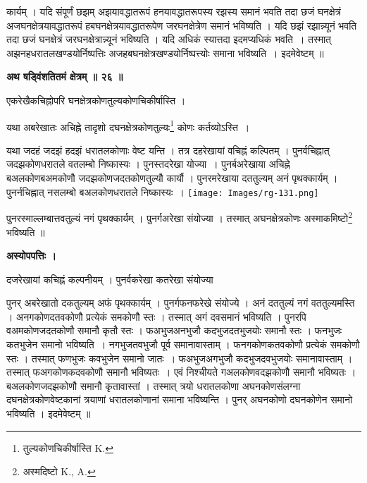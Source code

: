 \documentclass[11pt, openany]{book}
\begin{document}
\newpage
\noindent कार्यम् । यदि संपूर्णं छझम् अझयावद्धातरूपं हनयावद्धातरूपस्य रझस्य समानं भवति तदा छजं घनक्षेत्रं अजघनक्षेत्रयावद्धातरूपं हबघनक्षेत्रयावद्धातरूपेण जरघनक्षेत्रेण समानं भविष्यति । यदि छझं रझान्न्यूनं भवति तदा छजं घनक्षेत्रं जरघनक्षेत्रान्न्यूनं भविष्यति । यदि अधिकं स्यात्तदा इदमप्यधिकं भवति~। तस्मात् अझनहधरातलखण्डयोर्निष्पत्तिः अजहबघनक्षेत्रखण्डयोर्निष्पत्त्योः समाना भविष्यति~। इदमेवेष्टम् ॥\\
\vspace{3mm}

\begin{center}
\textbf{\large अथ षड्विंशतितमं क्षेत्रम् ॥ २६ ॥}
\end{center}
\vspace{5mm}

{\ab एकरेखैकचिह्नोपरि घनक्षेत्रकोणतुल्यकोणचिकीर्षास्ति ।}\\
\vspace{3mm}

यथा अबरेखातः अचिह्ने तादृशो दघनक्षेत्रकोणतुल्यः\renewcommand{\thefootnote}{१}\footnote{तुल्यकोणचिकीर्षास्ति {\en K.}} कोणः
कर्तव्योऽस्ति~। 
\begin{vwcol}[widths={0.55,0.45}, sep=.8cm, rule=0pt]
यथा जदहं जदझं हदझं धरातलकोणाः वेष्ट यन्ति । तत्र दहरेखायां वचिह्नं
कल्पितम् । पुनर्वचिह्नात् जदझकोणधरातले वतलम्बो निष्कास्यः ।
पुनस्तदरेखा योज्या~। पुनर्बअरेखाया अचिह्ने बअलकोणबअमकोणौ जदझकोणजदतकोणतुल्यौ
कार्यौ । पुनरमरेखाया दततुल्यम् अनं पृथक्कार्यम् । पुनर्नचिह्नात्
नसलम्बो बअलकोणधरातले निष्कास्यः~।
\noindent \texttt{[image: Images/rg-131.png]}
\end{vwcol}
\vspace{-2mm}

\noindent  पुनरस्माल्लम्बात्तवतुल्यं नगं पृथक्कार्यम् । पुनर्गअरेखा संयोज्या । तस्मात् अघनक्षेत्रकोणः अस्माकमिष्टो\renewcommand{\thefootnote}{२}\footnote{अस्मदिष्टो {\en K., A.}} भविष्यति ॥\\
\begin{center}
\textbf{अस्योपपत्तिः ।}
\end{center}
\vspace{5mm}

दजरेखायां कचिह्नं कल्पनीयम् । पुनर्वकरेखा कतरेखा
संयोज्या

\newpage
\noindent पुनर् अबरेखातो दकतुल्यम् अफं पृथक्कार्यम् । पुनर्गफनफरेखे
संयोज्ये । अनं दततुल्यं नगं वततुल्यमस्ति । अनगकोणदतवकोणौ प्रत्येकं समकोणौ स्तः । तस्मात् अगं दवसमानं भविष्यति । पुनरपि वअमकोणजदतकोणौ समानौ कृतौ स्तः । फअभुजअनभुजौ कदभुजदतभुजयोः समानौ स्तः । फनभुजः कतभुजेन समानो भविष्यति~। नगभुजतवभुजौ पूर्व समानावास्ताम् । फनगकोणकतवकोणौ प्रत्येकं समकोणौ स्तः । तस्मात् फणभुजः कवभुजेन समानो जातः~। फअभुजअगभुजौ कदभुजदवभुजयोः समानावास्ताम् । तस्मात् फअगकोणकदवकोणौ समानौ भविष्यतः~। एवं निश्चीयते गअलकोणवदझकोणौ समानौ भविष्यतः । बअलकोणजदझकोणौ समानौ कृतावास्तां । तस्मात् त्रयो धरातलकोणा अघनकोणसंलग्ना दघनक्षेत्रकोणवेष्टकानां त्रयाणां धरातलकोणानां समाना भविष्यन्ति ।
पुनर् अघनकोणो दघनकोणेन समानो भविष्यति । इदमेवेष्टम् ॥\\
\vspace{5mm}
\end{document}
